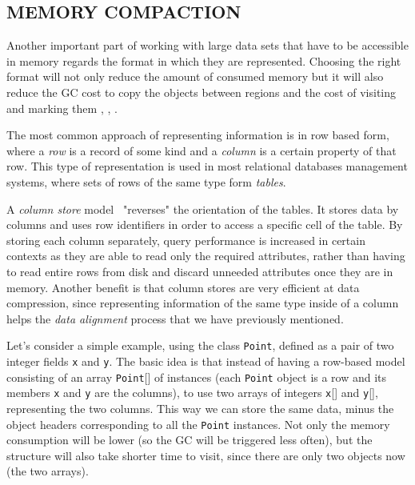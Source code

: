 \documentclass[a4paper,twoside]{article}
\begin{document}
\subsection{\uppercase{Memory Compaction}}
\label{subsec:compaction}

Another important part of working with large data sets that have to be accessible in memory regards the format in which they are represented.
Choosing the right format will not only reduce the amount of consumed memory but it will also reduce the GC cost to copy the objects between regions and the cost of visiting and marking them
\cite{schatzl:2011}, \cite{eimouri:2016}, \cite{eimouri:2017}.


The most common approach of representing information is in row based form, where a {\textit{row}} is a record of some kind and a {\textit{column}} is a certain property of that row.
This type of representation is used in most relational databases management systems, where sets of rows of the same type form {\textit{tables}}.

A {\textit{column store}} model~\cite{abadi:2013} "reverses" the orientation of the tables.
It stores data by columns and uses row identifiers in order to access a specific cell of the table.
By storing each column separately, query performance is increased in certain contexts as they are able to read only the required attributes, rather than having to read entire rows from disk and discard unneeded attributes once they are in memory.
Another benefit is that column stores are very efficient at data compression, since representing information of the same type inside of a column helps the {\textit{data alignment}} process that we have previously mentioned.

Let's consider a simple example, using the class \texttt{Point}, defined as a pair of two integer fields \texttt{x} and \texttt{y}.
The basic idea is that instead of having a row-based model consisting of an array {\texttt{Point}[]} of instances (each {\texttt{Point}} object is a row and its members \texttt{x} and \texttt{y} are the columns), to use two arrays of integers {\texttt{x}[]} and {\texttt{y}[]}, representing the two columns.
This way we can store the same data, minus the object headers corresponding to all the {\texttt{Point}} instances.
Not only the memory consumption will be lower (so the GC will be triggered less often), but the structure will also take shorter time to visit, since there are only two objects now (the two arrays).
\end{document}
